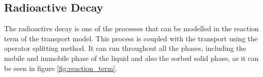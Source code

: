 % 


\subsection{Radioactive Decay}
\label{sec:decay}
The radioactive decay is one of the processes that can be modelled in the reaction term of the transport model.
This process is coupled with the transport using the operator splitting method.
It can run throughout all the phases, including the mobile and immobile phase of the liquid 
and also the sorbed solid phase, as it can be seen in figure \ref{fig:reaction_term}.

